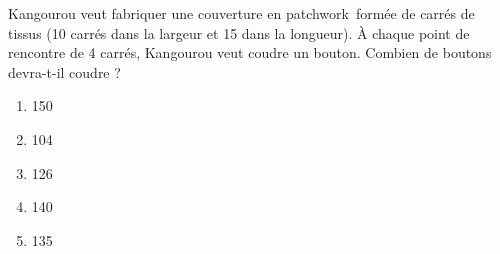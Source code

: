 Kangourou veut fabriquer une couverture \og en patchwork\fg\ formée de carrés de tissus (10 carrés dans la largeur et 15 dans la longueur). \`A chaque point de rencontre de 4 carrés, Kangourou veut coudre un bouton. Combien de boutons devra-t-il coudre ?
\begin{multicols}{5}
  \begin{enumerate}[A/]
  \item 150
  \item 104
  \item 126
  \item 140
  \item 135
  \end{enumerate}
\end{multicols}